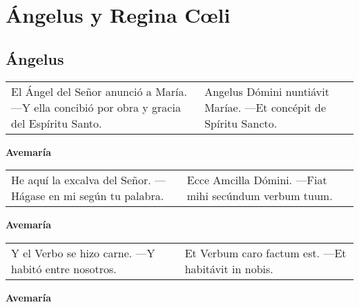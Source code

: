 


\chapter*{Ángelus y Regina Cœli}

\section*{Ángelus}

\begin{longtable} { p{} p{} }
    El Ángel del Señor anunció a María. ---Y ella concibió por obra y gracia del Espíritu Santo.                   
    
     & 
    
    Angelus Dómini nuntiávit Maríae. ---Et concépit de Spíritu Sancto.
\end{longtable}

\begin{center}
    \textbf{Avemaría}
\end{center}

\begin{longtable} { p{} p{} }
    He aquí la excalva del Señor. ---Hágase en mi según tu palabra. 
    
     & 
    
    Ecce Amcilla Dómini. ---Fiat mihi secúndum verbum tuum.
\end{longtable}

\begin{center}
    \textbf{Avemaría}
\end{center}

\begin{longtable} { p{} p{} }
    Y el Verbo se hizo carne. ---Y habitó entre nosotros.
    
     & 
    
    Et Verbum caro factum est. ---Et habitávit in nobis.
\end{longtable}

\begin{center}
    \textbf{Avemaría}
\end{center}

